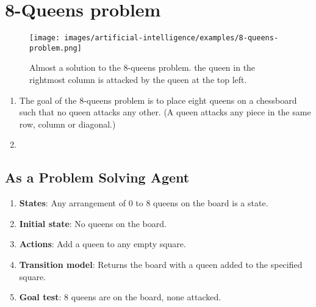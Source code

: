 \section{8-Queens problem}

\begin{figure}[H]
    \centering
    \texttt{[image: images/artificial-intelligence/examples/8-queens-problem.png]}
    \caption{Almost a solution to the 8-queens problem. the queen in the rightmost column is attacked by the queen at the top left.}
\end{figure}


\begin{enumerate}
    \item The goal of the 8-queens problem is to place eight queens on a chessboard such that no queen attacks any other. 
    (A queen attacks any piece in the same row, column or diagonal.) 
    \hfill \cite{ai/book/Artificial-Intelligence-A-Modern-Approach/Russell-Norvig}

    \item 
    \hfill \cite{ai/book/Artificial-Intelligence-A-Modern-Approach/Russell-Norvig}
\end{enumerate}


\subsection{As a Problem Solving Agent}

\begin{enumerate}
    \item \textbf{States}: Any arrangement of 0 to 8 queens on the board is a state.
    \hfill \cite{ai/book/Artificial-Intelligence-A-Modern-Approach/Russell-Norvig}
    
    \item \textbf{Initial state}: No queens on the board.
    \hfill \cite{ai/book/Artificial-Intelligence-A-Modern-Approach/Russell-Norvig}
    
    \item \textbf{Actions}: Add a queen to any empty square.
    \hfill \cite{ai/book/Artificial-Intelligence-A-Modern-Approach/Russell-Norvig}

    \item \textbf{Transition model}: Returns the board with a queen added to the specified square.
    \hfill \cite{ai/book/Artificial-Intelligence-A-Modern-Approach/Russell-Norvig}

    \item \textbf{Goal test}: 8 queens are on the board, none attacked.
    \hfill \cite{ai/book/Artificial-Intelligence-A-Modern-Approach/Russell-Norvig}
\end{enumerate}



